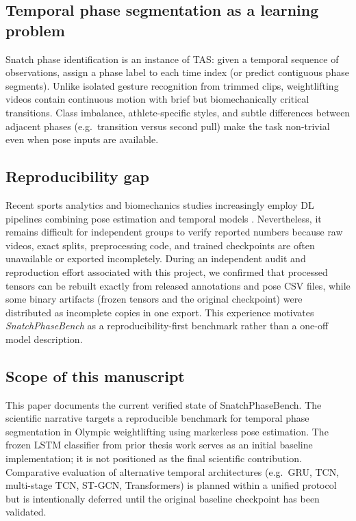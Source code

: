 \subsection{Temporal phase segmentation as a learning problem}

Snatch phase identification is an instance of \acf{TAS}: given a temporal sequence of observations, assign a phase label to each time index (or predict contiguous phase segments).
Unlike isolated gesture recognition from trimmed clips, weightlifting videos contain continuous motion with brief but biomechanically critical transitions.
Class imbalance, athlete-specific styles, and subtle differences between adjacent phases (e.g.\ transition versus second pull) make the task non-trivial even when pose inputs are available.

\subsection{Reproducibility gap}

Recent sports analytics and biomechanics studies increasingly employ \acs{DL} pipelines combining pose estimation and temporal models .
Nevertheless, it remains difficult for independent groups to verify reported numbers because raw videos, exact splits, preprocessing code, and trained checkpoints are often unavailable or exported incompletely.
During an independent audit and reproduction effort associated with this project, we confirmed that processed tensors can be rebuilt exactly from released annotations and pose CSV files, while some binary artifacts (frozen tensors and the original checkpoint) were distributed as incomplete copies in one export.
This experience motivates \emph{SnatchPhaseBench} as a reproducibility-first benchmark rather than a one-off model description.

\subsection{Scope of this manuscript}

This paper documents the current verified state of SnatchPhaseBench.
The scientific narrative targets a reproducible benchmark for temporal phase segmentation in Olympic weightlifting using markerless pose estimation.
The frozen \acs{LSTM} classifier from prior thesis work serves as an initial baseline implementation; it is not positioned as the final scientific contribution.
Comparative evaluation of alternative temporal architectures (e.g.\ \acs{GRU}, \acs{TCN}, multi-stage \acs{TCN}, \acs{ST-GCN}, Transformers) is planned within a unified protocol but is intentionally deferred until the original baseline checkpoint has been validated.

